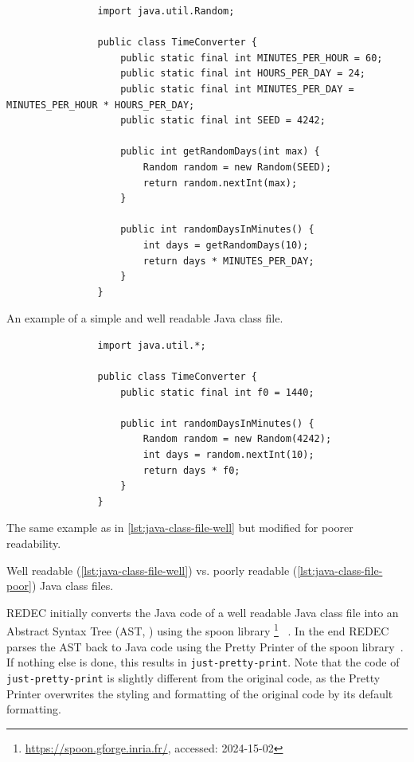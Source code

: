 \documentclass[%
class=scrreprt,
chapterprefix=false,%
open=right,%
twoside=true,%
paper=a4,%
logofile={Logo\_zentral\_farbig\_EN.png},%
thesistype=master,%
UKenglish,%
]{se2thesis}
\newcounter{urlfootnote}
\newcommand{\onecurl}[2]{%
	\stepcounter{urlfootnote}%
	\expandafter\def\csname urlfootnote:#1\endcsname{\theurlfootnote}%
	\footnote{\label{url:#1}\url{#1}, accessed: #2}%
}
\newcommand{\curl}[2]{%
		\onecurl{#1}{#2}%
}
\theoremstyle{definition}
\newcommand{\rdh}{REDEC\xspace}
\newcommand{\none}{just-pretty-print\xspace} %
\newcommand{\nonet}{\texttt{\none}\xspace} %
\begin{document}
	\begin{listing}[p]
		\begin{sublisting}{\linewidth}
			\begin{verbatim}
				import java.util.Random;
				
				public class TimeConverter {
					public static final int MINUTES_PER_HOUR = 60;
					public static final int HOURS_PER_DAY = 24;
					public static final int MINUTES_PER_DAY = MINUTES_PER_HOUR * HOURS_PER_DAY;
					public static final int SEED = 4242;
					
					public int getRandomDays(int max) {
						Random random = new Random(SEED);
						return random.nextInt(max);
					}
					
					public int randomDaysInMinutes() {
						int days = getRandomDays(10);
						return days * MINUTES_PER_DAY;
					}
				}
			\end{verbatim}
			\caption{An example of a simple and well readable Java class file.}
			\label{lst:java-class-file-well}
		\end{sublisting}
		
		\begin{sublisting}{\linewidth}
			\begin{verbatim}
				import java.util.*;
				
				public class TimeConverter {
					public static final int f0 = 1440;
					
					public int randomDaysInMinutes() {
						Random random = new Random(4242);
						int days = random.nextInt(10);
						return days * f0;
					}
				}
			\end{verbatim}
			\caption{The same example as in \autoref{lst:java-class-file-well} but modified for poorer readability.}
			\label{lst:java-class-file-poor}
		\end{sublisting}
		\caption{Well readable (\autoref{lst:java-class-file-well}) vs. poorly readable (\autoref{lst:java-class-file-poor}) Java class files.}
		\label{lst:java-class-file}
	\end{listing}

	
	\rdh initially converts the Java code of a well readable Java class file into an Abstract Syntax Tree (AST, ) using the spoon library\curl{https://spoon.gforge.inria.fr/}{2024-15-02}~\cite{pawlak2016spoon}. In the end \rdh parses the AST back to Java code using the Pretty Printer of the spoon library~\cite{pawlak2016spoon}. If nothing else is done, this results in \nonet. Note that the code of \nonet is slightly different from the original code, as the Pretty Printer overwrites the styling and formatting of the original code by its default formatting.
	
\end{document}
